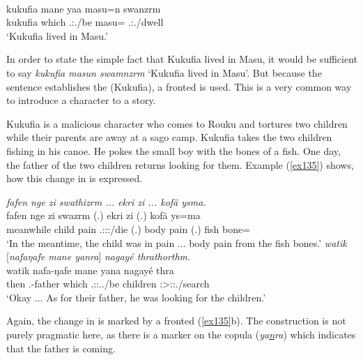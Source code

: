 \begin{exe}
	\\
	\gll kukufia mane yaa masu=n swanzrm\\
	kukufia which \Tsg.\Masc:\Pst.\Ipfv/be masu=\Loc{} \Tsg.\Masc:\Pst.\Dur/dwell\\
	\trans `Kukufia lived in Masu.'
	\label{ex134}
\end{exe}

In order to state the simple fact that Kukufia lived in Masu, it would be sufficient to say \emph{kukufia masun swamnzrm} `Kukufia lived in Masu'. But because the sentence establishes the  (Kukufia), a fronted  is used. This is a very common way to introduce a character to a story.%

Kukufia is a malicious character who comes to Rouku and tortures two children while their parents are away at a sago camp. Kukufia takes the two children fishing in his canoe. He pokes the small boy with the bones of a fish. One day, the father of the two children returns looking for them. Example (\ref{ex135}) shows, how this change in  is expressed.

\begin{exe}
	\ex \label{ex135}
	\begin{xlist}
	\ex
	\emph{fafen nge zi swathizrm ... ekri zi ... kofä ysma.}\\
	\gll fafen nge zi swazrm (.) ekri zi (.) kofä ys=ma\\
	meanwhile child pain \Tsg.\Masc:\Sbj:\Pst:\Dur/die (.) body pain (.) fish bone=\Char\\
	\trans `In the meantime, the child was in pain ... body pain from the fish bones.'
	\ex \emph{watik} [\emph{nafaŋafe mane yanra}] \emph{nagayé thrathorthm.}\\
	\gll watik nafa-ŋafe mane yana nagayé thra\\
	then \Third.\Poss-father which \Tsg.\Masc:\Sbj:\Pst.\Ipfv.\Venit/be children \Stsg:\Sbj>\Stpl:\Obj:\Irr.\Pfv/search\\
	\trans `Okay ... As for their father, he was looking for the children.'\\
	\end{xlist}
\end{exe}

Again, the change in  is marked by a fronted  (\ref{ex135}b). The construction is not purely pragmatic here, as there is a  marker on the copula (\emph{ya\uline{n}ra}) which indicates that the father is coming.%

